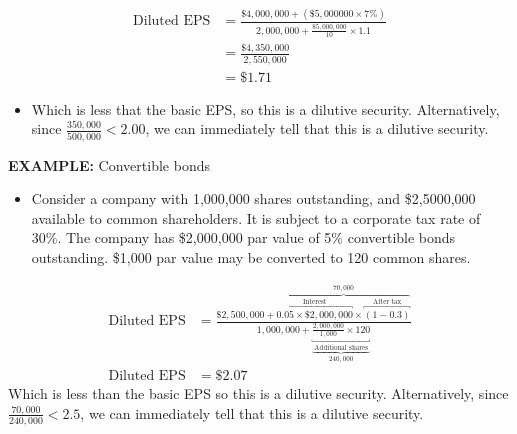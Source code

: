 \documentclass[../notes_compiled.tex]{subfiles}
\begin{document}
\begin{itemize}
{\color{RoyalBlue}
\begin{align*}
\text{Diluted EPS}  &=\frac{\$4,000,000 + (\$5,000000 \times 7\%)}{2,000,000 + \frac{\$5,000,000}{10}\times1.1} \\
&=\frac{\$4,350,000}{2,550,000} \\
&=\$1.71
\end{align*}
\begin{itemize}
\item[] Which is less that the basic EPS, so this is a dilutive security. Alternatively, since $\frac{350,000}{500,000} < 2.00$, we can immediately tell that this is a dilutive security.
\end{itemize}
}

{\color{RedViolet}
\item[] \textbf{EXAMPLE:} Convertible bonds
\begin{itemize}
\item[] Consider a company with 1,000,000 shares outstanding, and \$2,5000,000 available to common shareholders. It is subject to a corporate tax rate of 30\%. The company has \$2,000,000 par value of 5\% convertible bonds outstanding. \$1,000 par value may be converted to 120 common shares.
\end{itemize}
}
{\color{RoyalBlue}
\begin{align*}
\text{Diluted EPS} &= \frac{\$2,500,000 + \overbrace{\overbracket{0.05 \times \$2,000,000}^{\text{Interest}} \times \overbracket{(1-0.3)}^{\text{After tax}}}^{70,000}}{1,000,000 + \underbrace{\underbracket{\frac{2,000,000}{1,000}\times120}_{\text{Additional shares}}}_{240,000}} \\
\text{Diluted EPS} &= \$2.07
\end{align*}
Which is less than the basic EPS so this is a dilutive security. Alternatively, since $\frac{70,000}{240,000}<2.5$, we can immediately tell that this is a dilutive security.
}


\end{itemize}
\end{document}
